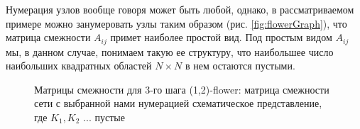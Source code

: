 \documentclass[10pt,aps,pra]{revtex4-1}
\begin{document}
        Нумерация узлов вообще говоря может быть любой, однако, в рассматриваемом примере можно занумеровать узлы таким образом (рис. \ref{fig:flowerGraph}), что матрица смежности $A_{ij}$ примет наиболее простой вид. Под простым видом $A_{ij}$ мы, в данном случае, понимаем такую ее структуру, что наибольшее число наибольших квадратных областей $N \times N$ в нем остаются пустыми.

            \begin{figure}[H]  
                \centering

                \caption{
                    \label{fig:flowerMatrix}
                    Матрицы смежности для 3-го шага (1,2)-flower:
                      матрица смежности сети с выбранной нами нумерацией
                     схематическое представление, где $K_1, K_2$ ... пустые
                }
            \end{figure}
\end{document}
